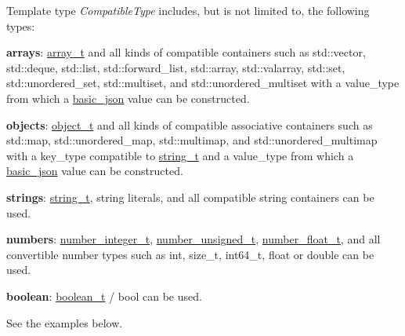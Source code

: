 Template type {\itshape Compatible\+Type} includes, but is not limited to, the following types\+:
\begin{DoxyItemize}
\item {\bfseries arrays}\+: \hyperlink{classnlohmann_1_1basic__json_a4c409f1b6d9caf3412c78af9a5883fed}{array\+\_\+t} and all kinds of compatible containers such as {\ttfamily std\+::vector}, {\ttfamily std\+::deque}, {\ttfamily std\+::list}, {\ttfamily std\+::forward\+\_\+list}, {\ttfamily std\+::array}, {\ttfamily std\+::valarray}, {\ttfamily std\+::set}, {\ttfamily std\+::unordered\+\_\+set}, {\ttfamily std\+::multiset}, and {\ttfamily std\+::unordered\+\_\+multiset} with a {\ttfamily value\+\_\+type} from which a \hyperlink{classnlohmann_1_1basic__json}{basic\+\_\+json} value can be constructed.
\item {\bfseries objects}\+: \hyperlink{classnlohmann_1_1basic__json_a0322396ca5cd4623bc816bf735377623}{object\+\_\+t} and all kinds of compatible associative containers such as {\ttfamily std\+::map}, {\ttfamily std\+::unordered\+\_\+map}, {\ttfamily std\+::multimap}, and {\ttfamily std\+::unordered\+\_\+multimap} with a {\ttfamily key\+\_\+type} compatible to \hyperlink{classnlohmann_1_1basic__json_a61f8566a1a85a424c7266fb531dca005}{string\+\_\+t} and a {\ttfamily value\+\_\+type} from which a \hyperlink{classnlohmann_1_1basic__json}{basic\+\_\+json} value can be constructed.
\item {\bfseries strings}\+: \hyperlink{classnlohmann_1_1basic__json_a61f8566a1a85a424c7266fb531dca005}{string\+\_\+t}, string literals, and all compatible string containers can be used.
\item {\bfseries numbers}\+: \hyperlink{classnlohmann_1_1basic__json_a98e611d67b7bd75307de99c9358ab2dc}{number\+\_\+integer\+\_\+t}, \hyperlink{classnlohmann_1_1basic__json_ab906e29b5d83ac162e823ada2156b989}{number\+\_\+unsigned\+\_\+t}, \hyperlink{classnlohmann_1_1basic__json_a88d6103cb3620410b35200ee8e313d97}{number\+\_\+float\+\_\+t}, and all convertible number types such as {\ttfamily int}, {\ttfamily size\+\_\+t}, {\ttfamily int64\+\_\+t}, {\ttfamily float} or {\ttfamily double} can be used.
\item {\bfseries boolean}\+: \hyperlink{classnlohmann_1_1basic__json_a4c919102a9b4fe0d588af64801436082}{boolean\+\_\+t} / {\ttfamily bool} can be used.
\end{DoxyItemize}

See the examples below.


